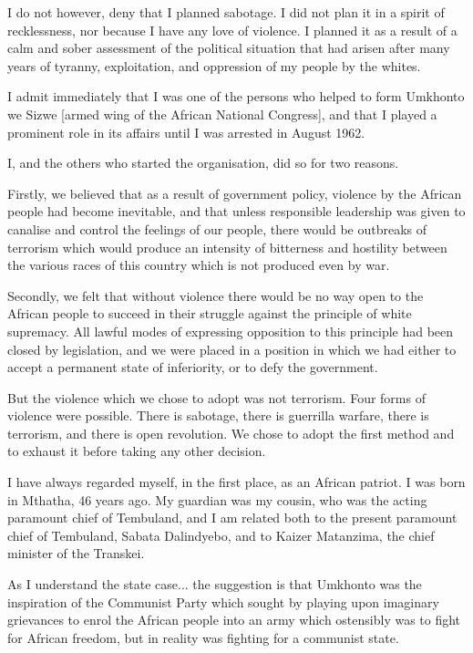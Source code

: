 \documentclass[11pt,a4paper]{article}
\begin{document}
\linenumbers\relax [$\ldots$] I do not however, deny that I planned sabotage. I did not plan it in a spirit of recklessness, nor
because I have any love of violence. I planned it as a result of a calm and sober
assessment of the political situation that had arisen after many years of tyranny,
exploitation, and oppression of my people by the whites.

I admit immediately that I was one of the persons who helped to form Umkhonto we Sizwe
[armed wing of the African National Congress], and that I played a prominent role in its
affairs until I was arrested in August 1962.

I, and the others who started the organisation, did so for two reasons.

Firstly, we believed that as a result of government policy, violence by the African people
had become inevitable, and that unless responsible leadership was given to canalise and
control the feelings of our people, there would be outbreaks of terrorism which would
produce an intensity of bitterness and hostility between the various races of this country
which is not produced even by war.

Secondly, we felt that without violence there would be no way open to the African people
to succeed in their struggle against the principle of white supremacy. All lawful modes of
expressing opposition to this principle had been closed by legislation, and we were placed
in a position in which we had either to accept a permanent state of inferiority, or to defy the
government.

But the violence which we chose to adopt was not terrorism. Four forms of violence were
possible. There is sabotage, there is guerrilla warfare, there is terrorism, and there is open
revolution. We chose to adopt the first method and to exhaust it before taking any other
decision.

I have always regarded myself, in the first place, as an African patriot. I was born in
Mthatha, 46 years ago. My guardian was my cousin, who was the acting paramount chief
of Tembuland, and I am related both to the present paramount chief of Tembuland, Sabata
Dalindyebo, and to Kaizer Matanzima, the chief minister of the Transkei.

As I understand the state case... the suggestion is that Umkhonto was the inspiration of
the Communist Party which sought by playing upon imaginary grievances to enrol the
African people into an army which ostensibly was to fight for African freedom, but in reality
was fighting for a communist state.
\end{document}
